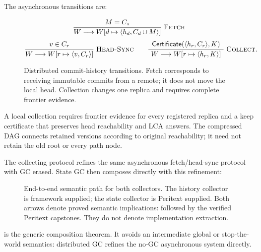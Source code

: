 The asynchronous transitions are:
\begin{figure}[H]
\footnotesize
\[
\Rule{Fetch}{M=C_s}{
 W\longrightarrow W[d\mapsto\langle h_d,C_d\cup M\rangle]}
\]
\[
\Rule{Head-Sync}{v\in C_r}{
 W\longrightarrow W[r\mapsto\langle v,C_r\rangle]}
\qquad
\Rule{Collect}{\mathsf{Certificate}(\langle h_r,C_r\rangle,K)}{
 W\longrightarrow W[r\mapsto\langle h_r,K\rangle]}.
\]
\caption{Distributed commit-history transitions. Fetch corresponds to
receiving immutable commits from a remote; it does not move the local head.
Collection changes one replica and requires complete frontier evidence.}
\label{fig:peritext-history-rules}
\end{figure}

A local collection requires frontier evidence for every registered replica
and a keep certificate that preserves head reachability and LCA answers. The
compressed DAG connects retained versions according to original reachability;
it need not retain the old root or every path node.

The collecting protocol refines the same asynchronous fetch/head-sync
protocol with GC erased. State GC then composes directly with this refinement:

\begin{figure}[H]
\centering
{}
\caption{End-to-end semantic path for both collectors. The history collector
is framework supplied; the state collector is Peritext supplied. Both arrows
denote proved semantic implications:  followed by
the verified Peritext capstones. They do not denote implementation extraction.}
\label{fig:end-to-end-gc}
\end{figure}

 is the generic composition theorem. It avoids
an intermediate global or stop-the-world semantics: distributed GC refines
the no-GC asynchronous system directly.


